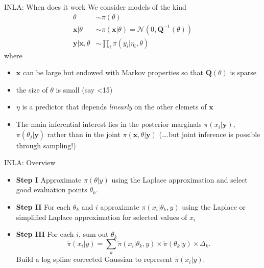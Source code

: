 \documentclass[
  ignorenonframetext,
]{beamer}
\begin{document}
\begin{frame}{INLA: When does it work}
\protect\hypertarget{inla-when-does-it-work}{}
We consider models of the kind \[
\begin{aligned}
\theta & \sim \pi(\theta)\\
\mathbf{x}|\theta& \sim \pi(\mathbf{x}|\theta) = \mathcal{N}(0, \mathbf{Q}^{-1}(\theta))\\
\mathbf{y}|\mathbf{x},\theta & \sim \prod_i\pi(y_i|\eta_i,\theta)
\end{aligned}
\] where

\begin{itemize}
\item
  \(\mathbf{x}\) can be large but endowed with Markov properties so that
  \(\mathbf{Q}(\theta)\) is sparse
\item
  the size of \(\theta\) is small (say \textless15)
\item
  \(\eta\) is a predictor that depends \emph{linearly} on the other
  elemets of \(\mathbf{x}\)
\item
  The main inferential interest lies in the posterior marginals
  \(\pi(x_i|\mathbf{y})\), \(\pi(\theta_j|\mathbf{y})\) rather than in
  the joint \(\pi(\mathbf{x},\theta|\mathbf{y})\) (\ldots.but joint
  inference is possible through sampling!)
\end{itemize}
\end{frame}

\begin{frame}{INLA: Overview}
\protect\hypertarget{inla-overview}{}
\begin{itemize}
\item
  \textbf{Step I} Approximate \(\pi({\theta}|y)\) using the Laplace
  approximation and select good evaluation points \({\theta}_k\).
\item
  \textbf{Step II} For each \({\theta}_k\) and \(i\) approximate
  \(\pi(x_i|{\theta}_k, {y})\) using the Laplace or simplified Laplace
  approximation for selected values of \(x_i\)
\item
  \textbf{Step III} For each \(i\), sum out \({\theta}_k\) \[
  \widetilde{\pi}(x_i|{y}) = \sum_k \widetilde{\pi}(x_i|{\theta}_k, {y}) \times
                    \widetilde{\pi}({\theta}_k|{y}) \times \Delta_k.
  \] Build a log spline corrected Gaussian to represent
  \(\widetilde{\pi}(x_i|{y})\).
\end{itemize}
\end{frame}
\end{document}
